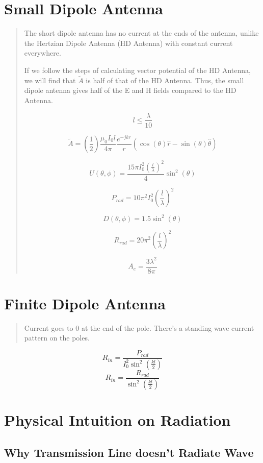 \documentclass{article} %
\begin{document}
\section{Small Dipole Antenna}

\begin{quote}
    The short dipole antenna has no current at the ends of the antenna, unlike the Hertzian Dipole Antenna (HD Antenna) with constant current everywhere.

    If we follow the steps of calculating vector potential of the HD Antenna, we will find that $\tilde{A}$ is half of that of the HD Antenna. Thus, the small dipole antenna gives half of the E and H fields compared to the HD Antenna.

    \[l \leq \frac{\lambda}{10}\]

    \[\tilde{A} = \left(\frac{1}{2}\right)\frac{\mu_0 I_0 l}{4 \pi}\frac{e^{-jkr}}{r}(\cos(\theta) \hat{r} -\sin(\theta) \hat{\theta})\]

    \[U(\theta, \phi) = \frac{15 \pi I_0 ^2\left(\frac{l}{\lambda}\right)^2}{4} \sin^2(\theta)\]

    \[P_{rad} = 10 \pi^2 I_0^2 \left(\frac{l}{\lambda}\right)^2\]

    \[D(\theta, \phi) = 1.5 \sin^2(\theta)\]

    \[R_{rad} = 20 \pi^2 \left(\frac{l}{\lambda}\right)^2\]

    \[A_e = \frac{3 \lambda ^2}{8 \pi}\]
\end{quote}

\section{Finite Dipole Antenna}
\begin{quote}
    Current goes to 0 at the end of the pole. There's a standing wave current pattern on the poles.
\end{quote}


\[R_{in} = \frac{P_{rad}}{I_0^2 \sin^2\left(\frac{kl}{2}\right)}\]
\[R_{in} = \frac{R_{rad}}{\sin^2\left(\frac{kl}{2}\right)}\]

\section{Physical Intuition on Radiation}
\subsection{Why Transmission Line doesn't Radiate Wave}
\end{document}
